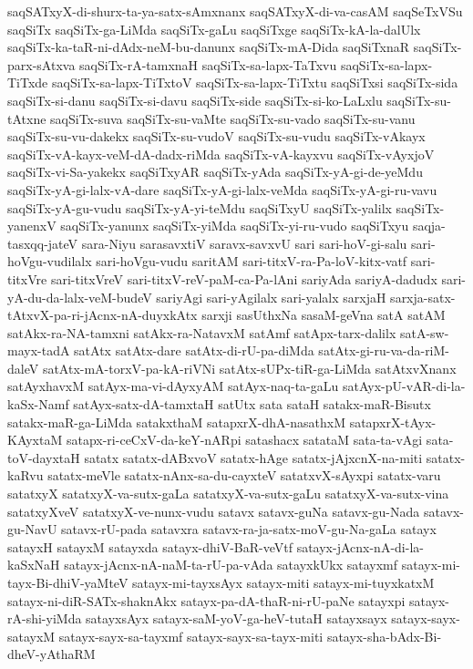 {saqSATxyX-di-shurx-ta-ya-satx-sAmxnanx
saqSATxyX-di-va-casAM
saqSeTxVSu
saqSiTx
saqSiTx-ga-LiMda
saqSiTx-gaLu
saqSiTxge
saqSiTx-kA-la-dalUlx
saqSiTx-ka-taR-ni-dAdx-neM-bu-danunx
saqSiTx-mA-Dida
saqSiTxnaR
saqSiTx-parx-sAtxva
saqSiTx-rA-tamxnaH
saqSiTx-sa-lapx-TaTxvu
saqSiTx-sa-lapx-TiTxde
saqSiTx-sa-lapx-TiTxtoV
saqSiTx-sa-lapx-TiTxtu
saqSiTxsi
saqSiTx-sida
saqSiTx-si-danu
saqSiTx-si-davu
saqSiTx-side
saqSiTx-si-ko-LaLxlu
saqSiTx-su-tAtxne
saqSiTx-suva
saqSiTx-su-vaMte
saqSiTx-su-vado
saqSiTx-su-vanu
saqSiTx-su-vu-dakekx
saqSiTx-su-vudoV
saqSiTx-su-vudu
saqSiTx-vAkayx
saqSiTx-vA-kayx-veM-dA-dadx-riMda
saqSiTx-vA-kayxvu
saqSiTx-vAyxjoV
saqSiTx-vi-Sa-yakekx
saqSiTxyAR
saqSiTx-yAda
saqSiTx-yA-gi-de-yeMdu
saqSiTx-yA-gi-lalx-vA-dare
saqSiTx-yA-gi-lalx-veMda
saqSiTx-yA-gi-ru-vavu
saqSiTx-yA-gu-vudu
saqSiTx-yA-yi-teMdu
saqSiTxyU
saqSiTx-yalilx
saqSiTx-yanenxV
saqSiTx-yanunx
saqSiTx-yiMda
saqSiTx-yi-ru-vudo
saqSiTxyu
saqja-tasxqq-jateV
sara-Niyu
sarasavxtiV
saravx-savxvU
sari
sari-hoV-gi-salu
sari-hoVgu-vudilalx
sari-hoVgu-vudu
saritAM
sari-titxV-ra-Pa-loV-kitx-vatf
sari-titxVre
sari-titxVreV
sari-titxV-reV-paM-ca-Pa-lAni
sariyAda
sariyA-dadudx
sari-yA-du-da-lalx-veM-budeV
sariyAgi
sari-yAgilalx
sari-yalalx
sarxjaH
sarxja-satx-tAtxvX-pa-ri-jAcnx-nA-duyxkAtx
sarxji
sasUthxNa
sasaM-geVna
satA
satAM
satAkx-ra-NA-tamxni
satAkx-ra-NatavxM
satAmf
satApx-tarx-dalilx
satA-sw-mayx-tadA
satAtx
satAtx-dare
satAtx-di-rU-pa-diMda
satAtx-gi-ru-va-da-riM-daleV
satAtx-mA-torxV-pa-kA-riVNi
satAtx-sUPx-tiR-ga-LiMda
satAtxvXnanx
satAyxhavxM
satAyx-ma-vi-dAyxyAM
satAyx-naq-ta-gaLu
satAyx-pU-vAR-di-la-kaSx-Namf
satAyx-satx-dA-tamxtaH
satUtx
sata
sataH
satakx-maR-Bisutx
satakx-maR-ga-LiMda
satakxthaM
satapxrX-dhA-nasathxM
satapxrX-tAyx-KAyxtaM
satapx-ri-ceCxV-da-keY-nARpi
satashacx
satataM
sata-ta-vAgi
sata-toV-dayxtaH
satatx
satatx-dABxvoV
satatx-hAge
satatx-jAjxcnX-na-miti
satatx-kaRvu
satatx-meVle
satatx-nAnx-sa-du-cayxteV
satatxvX-sAyxpi
satatx-varu
satatxyX
satatxyX-va-sutx-gaLa
satatxyX-va-sutx-gaLu
satatxyX-va-sutx-vina
satatxyXveV
satatxyX-ve-nunx-vudu
satavx
satavx-guNa
satavx-gu-Nada
satavx-gu-NavU
satavx-rU-pada
satavxra
satavx-ra-ja-satx-moV-gu-Na-gaLa
satayx
satayxH
satayxM
satayxda
satayx-dhiV-BaR-veVtf
satayx-jAcnx-nA-di-la-kaSxNaH
satayx-jAcnx-nA-naM-ta-rU-pa-vAda
satayxkUkx
satayxmf
satayx-mi-tayx-Bi-dhiV-yaMteV
satayx-mi-tayxsAyx
satayx-miti
satayx-mi-tuyxkatxM
satayx-ni-diR-SATx-shaknAkx
satayx-pa-dA-thaR-ni-rU-paNe
satayxpi
satayx-rA-shi-yiMda
satayxsAyx
satayx-saM-yoV-ga-heV-tutaH
satayxsayx
satayx-sayx-satayxM
satayx-sayx-sa-tayxmf
satayx-sayx-sa-tayx-miti
satayx-sha-bAdx-Bi-dheV-yAthaRM
}
